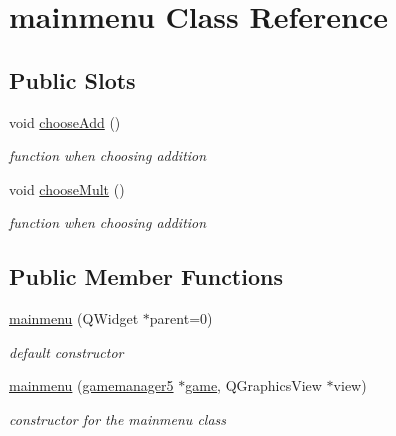 \hypertarget{classmainmenu}{\section{mainmenu \-Class \-Reference}
\label{classmainmenu}
}
\subsection*{\-Public \-Slots}
\begin{DoxyCompactItemize}
\item 
void \hyperlink{classmainmenu_a3637e219cb0b49a98347733ec5ab6013}{choose\-Add} ()
\begin{DoxyCompactList}\small\item\em function when choosing addition \end{DoxyCompactList}\item 
void \hyperlink{classmainmenu_a6700d452d062a301a021180d9e3a11d2}{choose\-Mult} ()
\begin{DoxyCompactList}\small\item\em function when choosing addition \end{DoxyCompactList}\end{DoxyCompactItemize}
\subsection*{\-Public \-Member \-Functions}
\begin{DoxyCompactItemize}
\item 
\hypertarget{classmainmenu_acb09eb31e85e22931f64dba89019bc4d}{\hyperlink{classmainmenu_acb09eb31e85e22931f64dba89019bc4d}{mainmenu} (\-Q\-Widget $\ast$parent=0)}\label{classmainmenu_acb09eb31e85e22931f64dba89019bc4d}

\begin{DoxyCompactList}\small\item\em default constructor \end{DoxyCompactList}\item 
\hyperlink{classmainmenu_ada313363dfff85802989a4e83701fa04}{mainmenu} (\hyperlink{classgamemanager5}{gamemanager5} $\ast$\hyperlink{classmainmenu_a27cdd4d8a9fb0d5bceca1095c9cfccd3}{game}, \-Q\-Graphics\-View $\ast$view)
\begin{DoxyCompactList}\small\item\em constructor for the mainmenu class \end{DoxyCompactList}\end{DoxyCompactItemize}
